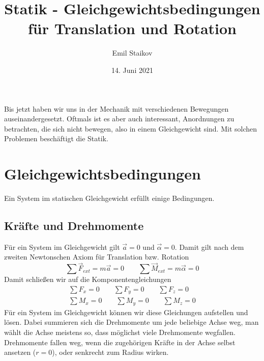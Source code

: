 \documentclass[11pt]{article}
\title{Statik - Gleichgewichtsbedingungen für Translation und Rotation}
\author{Emil Staikov}
\date{14. Juni 2021}
\begin{document}
\maketitle
Bis jetzt haben wir uns in der Mechanik mit verschiedenen Bewegungen auseinandergesetzt. Oftmals ist es aber auch interessant, Anordnungen zu betrachten, die sich nicht bewegen, also in einem Gleichgewicht sind. Mit solchen Problemen beschäftigt die Statik. 


\section{Gleichgewichtsbedingungen}
Ein System im statischen Gleichgewicht erfüllt einige Bedingungen. 
\subsection{Kräfte und Drehmomente}
Für ein System im Gleichgewicht gilt $\vec{a} = 0$ und $\vec{\alpha} = 0$. Damit gilt nach dem zweiten Newtonschen Axiom für Translation bzw. Rotation 
\begin{equation*}
        \sum \vec{F}_{ext} = m\vec{a} = 0 \quad \quad \sum \vec{M}_{ext} = m\vec{\alpha} = 0
\end{equation*}
Damit schließen wir auf die Komponentengleichungen 
\begin{gather*}
        \sum F_x = 0 \quad \quad \sum F_y = 0 \quad \quad \sum F_z = 0 \\
        \sum M_x = 0 \quad \quad \sum M_y = 0 \quad \quad \sum M_z = 0 
\end{gather*}
Für ein System im Gleichgewicht können wir diese Gleichungen aufstellen und lösen. Dabei summieren sich die Drehmomente um jede beliebige Achse weg, man wählt die Achse meistens so, dass möglichst viele Drehmomente wegfallen. Drehmomente fallen weg, wenn die zugehörigen Kräfte in der Achse selbst ansetzen ($r = 0$), oder senkrecht zum Radius wirken. 
\end{document}
